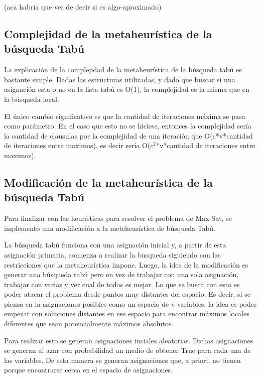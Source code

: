 \documentclass[a4paper,10pt]{article}
\begin{document}
(aca habria que ver de decir si es algo-aproximado)

\subsection*{Complejidad de la metaheur\'istica de la b\'usqueda Tab\'u}

La explicaci\'on de la complejidad de la metaheur\'istica de la b\'usqueda tab\'u es bastante simple. Dadas las estructuras utilizadas, y dado que buscar si una asignaci\'on esta o no en la lista tab\'u es O(1), la complejidad es la misma que en la b\'usqueda local.

El \'unico cambio significativo es que la cantidad de iteraciones m\'axima se pasa como par\'ametro. En el caso que esto no se hiciese, entonces la complejidad ser\'ia la cantidad de clausulas por la complejidad de una iteraci\'on que O(c*v*cantidad de iteraciones entre maximos), es decir ser\'ia O($c^2$*v*cantidad de iteraciones entre maximos).


\subsection*{Modificaci\'on de la metaheur\'istica de la b\'usqueda Tab\'u}

Para finalizar con las heur\'isticas para resolver el problema de Max-Sat, se implemento una modificaci\'on a la meteheur\'istica de b\'usqueda Tab\'u.

La b\'usqueda tab\'u funciona con una asignaci\'on inicial y, a partir de esta asignaci\'on primaria, comienza a realizar la busqueda siguiendo con las restricciones que la metaheur\'istica impone. Luego, la idea de la modificaci\'on es generar una b\'usqueda tab\'u pero en vez de trabajar con una sola asignaci\'on, trabajar con varias y ver cual de todas es mejor. Lo que se busca con esto es poder atacar el problema desde puntos muy distantes del espacio. Es decir, si se piensa en la asignaciones posibles como un espacio de v variables, la idea es poder empezar con soluciones distantes en ese espacio para encontrar m\'aximos locales diferentes que sean potencialmente m\'aximos absolutos.

Para realizar esto se generan asignaciones inciales aleatorias. Dichas asignaciones se generan al azar con probabilidad un medio de obtener True para cada una de las variables. De esta manera se generan asignaciones que, a priori, no tienen porque encontrarse cerca en el espacio de asignaciones.
\end{document}
